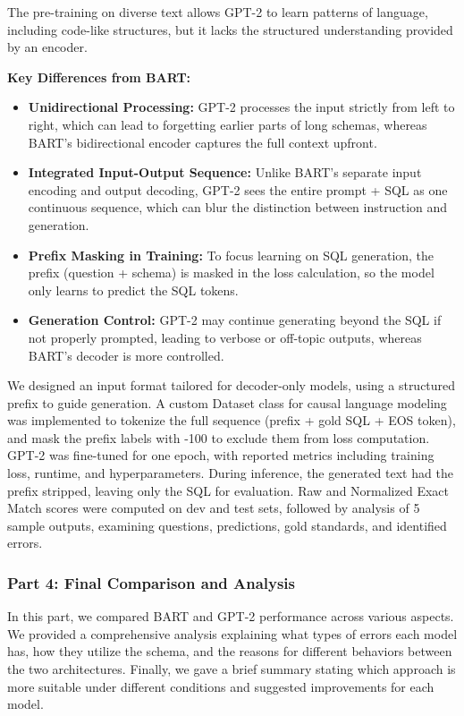 The pre-training on diverse text allows GPT-2 to learn patterns of language, including code-like structures, but it lacks the structured understanding provided by an encoder.

\textbf{Key Differences from BART:}
\begin{itemize}
    \item \textbf{Unidirectional Processing:} GPT-2 processes the input strictly from left to right, which can lead to forgetting earlier parts of long schemas, whereas BART's bidirectional encoder captures the full context upfront.
    \item \textbf{Integrated Input-Output Sequence:} Unlike BART's separate input encoding and output decoding, GPT-2 sees the entire prompt + SQL as one continuous sequence, which can blur the distinction between instruction and generation.
    \item \textbf{Prefix Masking in Training:} To focus learning on SQL generation, the prefix (question + schema) is masked in the loss calculation, so the model only learns to predict the SQL tokens.
    \item \textbf{Generation Control:} GPT-2 may continue generating beyond the SQL if not properly prompted, leading to verbose or off-topic outputs, whereas BART's decoder is more controlled.
\end{itemize}

We designed an input format tailored for decoder-only models, using a structured prefix to guide generation. A custom Dataset class for causal language modeling was implemented to tokenize the full sequence (prefix + gold SQL + EOS token), and mask the prefix labels with -100 to exclude them from loss computation. GPT-2 was fine-tuned for one epoch, with reported metrics including training loss, runtime, and hyperparameters. During inference, the generated text had the prefix stripped, leaving only the SQL for evaluation. Raw and Normalized Exact Match scores were computed on dev and test sets, followed by analysis of 5 sample outputs, examining questions, predictions, gold standards, and identified errors.

\subsubsection{Part 4: Final Comparison and Analysis}
In this part, we compared BART and GPT-2 performance across various aspects. We provided a comprehensive analysis explaining what types of errors each model has, how they utilize the schema, and the reasons for different behaviors between the two architectures. Finally, we gave a brief summary stating which approach is more suitable under different conditions and suggested improvements for each model.

